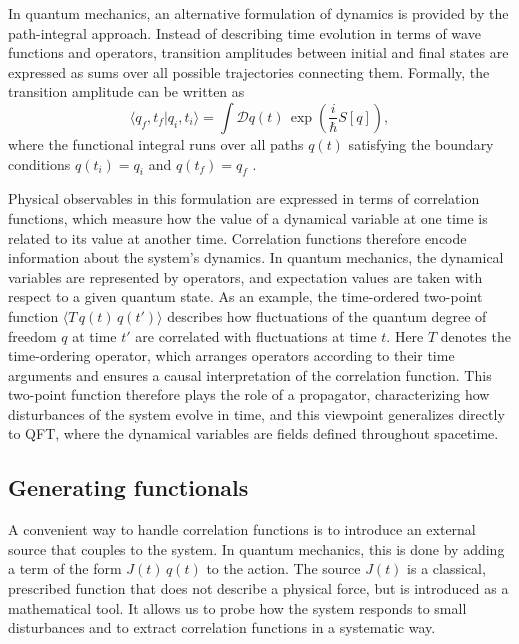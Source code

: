 In quantum mechanics, an alternative formulation of dynamics is provided by the
path-integral approach. Instead of describing time evolution in terms of wave
functions and operators, transition amplitudes between initial and final states
are expressed as sums over all possible trajectories connecting them. Formally,
the transition amplitude can be written as
\begin{equation}
\langle q_f, t_f | q_i, t_i \rangle
= \int \mathcal{D}q(t)\,
\exp\!\left(\frac{i}{\hbar} S[q]\right),
\end{equation}
where the functional integral runs over all paths $q(t)$ satisfying the
boundary conditions $q(t_i)=q_i$ and $q(t_f)=q_f$
\cite{FeynmanHibbs1965,Schulman1981}.

Physical observables in this formulation are expressed in terms of correlation
functions, which measure how the value of a dynamical variable at one time is
related to its value at another time. Correlation functions therefore encode
information about the system’s dynamics. In quantum mechanics, the dynamical 
variables are represented by operators, and expectation values are taken with
respect to a given quantum state. As an example, the time-ordered two-point function
\(\langle T\, q(t)\, q(t') \rangle\) describes how fluctuations of the quantum
degree of freedom \(q\) at time \(t'\) are correlated with fluctuations at time
\(t\). Here \(T\) denotes the time-ordering operator, which arranges operators
according to their time arguments and ensures a causal interpretation of the
correlation function. This two-point function therefore plays the role of a
propagator, characterizing how disturbances of the system evolve in time, and
this viewpoint generalizes directly to QFT, where the dynamical
variables are fields defined throughout spacetime.

\subsection*{Generating functionals}

A convenient way to handle correlation functions is to introduce an external
source that couples to the system. In quantum mechanics, this is done by adding
a term of the form $J(t)\,q(t)$ to the action. The source $J(t)$ is a classical,
prescribed function that does not describe a physical force, but is introduced
as a mathematical tool. It allows us to probe how the system responds to small
disturbances and to extract correlation functions in a systematic way.

